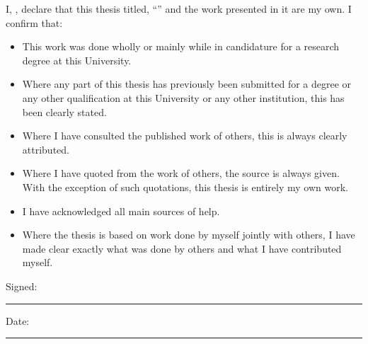 \documentclass[
12pt, %
english, %
singlespacing, %
headsepline, %
]{MastersDoctoralThesis} %
\begin{document}

\begin{declaration}
\addchaptertocentry{\authorshipname} %
\noindent I, \authorname, declare that this thesis titled, \enquote{\ttitle} and the work presented in it are my own. I confirm that:

\begin{itemize} 
\item This work was done wholly or mainly while in candidature for a research degree at this University.
\item Where any part of this thesis has previously been submitted for a degree or any other qualification at this University or any other institution, this has been clearly stated.
\item Where I have consulted the published work of others, this is always clearly attributed.
\item Where I have quoted from the work of others, the source is always given. With the exception of such quotations, this thesis is entirely my own work.
\item I have acknowledged all main sources of help.
\item Where the thesis is based on work done by myself jointly with others, I have made clear exactly what was done by others and what I have contributed myself.\\
\end{itemize}
 
\noindent Signed:\\
\rule[0.5em]{25em}{0.5pt} %
 
\noindent Date:\\
\rule[0.5em]{25em}{0.5pt} %
\end{declaration}

\cleardoublepage

%
%
%
\end{document}

